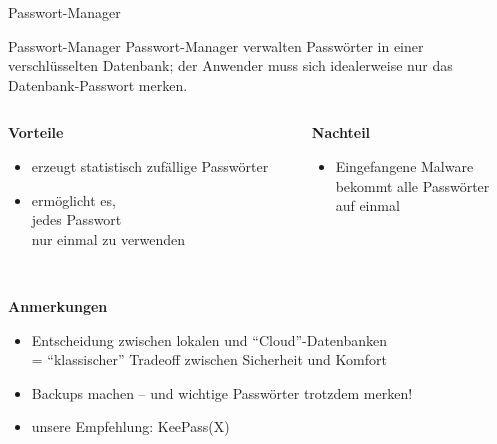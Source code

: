 \begin{frame}{Passwort-Manager}
  \begin{block}{Passwort-Manager}
    Passwort-Manager verwalten Passwörter in einer verschlüsselten Datenbank; der Anwender muss sich idealerweise nur das Datenbank-Passwort merken.
  \end{block}
  \begin{columns}
    \begin{column}{.5\textwidth}
      \pause
      \textbf{Vorteile}
      \begin{itemize}
        \small
        \item erzeugt statistisch zufällige Passwörter
        \item ermöglicht es,\\jedes Passwort\\nur einmal zu verwenden
      \end{itemize}
    \end{column}
    \begin{column}{.5\textwidth}
      \pause
      \textbf{Nachteil}
      \begin{itemize}
        \small
        \item Eingefangene Malware\\bekommt alle Passwörter\\auf einmal
      \end{itemize}
    \end{column}
  \end{columns}
  ~\\
  \pause
  \textbf{Anmerkungen}
  \begin{itemize}
    \small
    \item Entscheidung zwischen lokalen und ``Cloud''-Datenbanken\\ = ``klassischer'' Tradeoff zwischen Sicherheit und Komfort
    \item Backups machen -- und wichtige Passwörter trotzdem merken!
    \item unsere Empfehlung: KeePass(X)
  \end{itemize}
\end{frame}

\endinput
